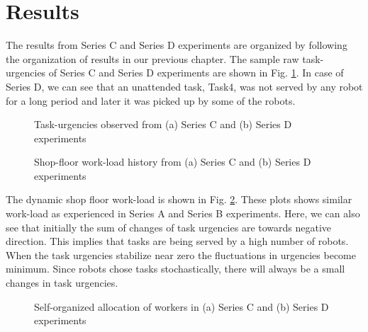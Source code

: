 \section{Results}
\label{sec:results}
The results from Series C and Series D experiments are organized by following the organization of results in our previous chapter. The sample raw task-urgencies of Series C and Series D experiments are shown in Fig. \ref{fig:raw-urgencies-SC-SD}. In case of Series D, we can see that an unattended task, Task4, was not served by any robot for a long period and later it was picked up by some of the robots. 
\begin{figure}
\centering
{}
\caption{\small Task-urgencies observed from (a) Series C and (b) Series D experiments}
\label{fig:raw-urgencies-SC-SD} 
\end{figure}
\begin{figure}
\centering
{}
\caption{\small Shop-floor work-load history from (a) Series C and (b) Series D experiments}
\label{fig:workload-SC-SD} 
\end{figure}
The dynamic shop floor work-load is shown in Fig. \ref{fig:workload-SC-SD}. These plots shows similar work-load as experienced in Series A and Series B experiments. Here, we can also see that initially the sum of changes of task urgencies are towards negative direction. This implies that tasks are being served by a high number of robots. When the task urgencies stabilize near zero the fluctuations in urgencies become minimum. Since robots chose tasks stochastically, there will always be a small changes in task urgencies.\\
%
\begin{figure}
\centering
{}
\caption{\small Self-organized allocation of workers in (a) Series C and (b) Series D experiments}
\label{fig:plasticity-SC-SD} 
\end{figure}
